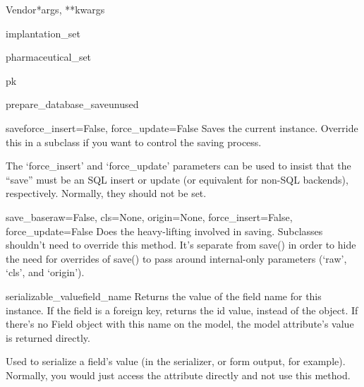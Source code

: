 \documentclass[letterpaper,10pt,english]{sphinxmanual}
\begin{document}
\begin{classdesc}{Vendor}{*args, **kwargs}
\hypertarget{data.models.Vendor.implantation_set}{}\begin{memberdesc}[Vendor]{implantation\_set}\end{memberdesc}

\hypertarget{data.models.Vendor.pharmaceutical_set}{}\begin{memberdesc}[Vendor]{pharmaceutical\_set}\end{memberdesc}

\hypertarget{data.models.Vendor.pk}{}\begin{memberdesc}[Vendor]{pk}\end{memberdesc}

\hypertarget{data.models.Vendor.prepare_database_save}{}\begin{methoddesc}[Vendor]{prepare\_database\_save}{unused}\end{methoddesc}

\hypertarget{data.models.Vendor.save}{}\begin{methoddesc}[Vendor]{save}{force\_insert=False, force\_update=False}
Saves the current instance. Override this in a subclass if you want to
control the saving process.

The `force\_insert' and `force\_update' parameters can be used to insist
that the ``save'' must be an SQL insert or update (or equivalent for
non-SQL backends), respectively. Normally, they should not be set.
\end{methoddesc}

\hypertarget{data.models.Vendor.save_base}{}\begin{methoddesc}[Vendor]{save\_base}{raw=False, cls=None, origin=None, force\_insert=False, force\_update=False}
Does the heavy-lifting involved in saving. Subclasses shouldn't need to
override this method. It's separate from save() in order to hide the
need for overrides of save() to pass around internal-only parameters
(`raw', `cls', and `origin').
\end{methoddesc}

\hypertarget{data.models.Vendor.serializable_value}{}\begin{methoddesc}[Vendor]{serializable\_value}{field\_name}
Returns the value of the field name for this instance. If the field is
a foreign key, returns the id value, instead of the object. If there's
no Field object with this name on the model, the model attribute's
value is returned directly.

Used to serialize a field's value (in the serializer, or form output,
for example). Normally, you would just access the attribute directly
and not use this method.
\end{methoddesc}
\end{classdesc}
\end{document}
